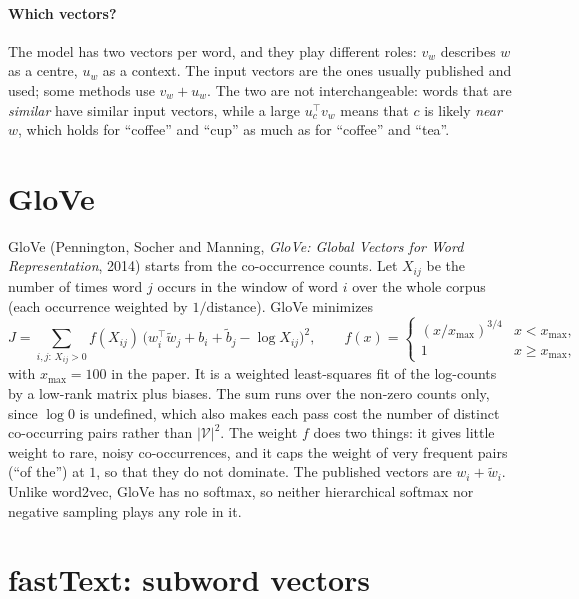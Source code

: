 \begin{notechapter}
\paragraph{Which vectors?} The model has two vectors per word, and they play different roles:
$v_w$ describes $w$ as a centre, $u_w$ as a context. The input vectors are the ones usually published and
used; some methods use $v_w + u_w$. The two are not interchangeable: words that are \emph{similar} have
similar input vectors, while a large $u_c^\top v_w$ means that $c$ is likely \emph{near} $w$, which holds for
``coffee'' and ``cup'' as much as for ``coffee'' and ``tea''.

\section{GloVe}\label{word-embeddings:sec:glove}

GloVe (Pennington, Socher and Manning, \emph{GloVe: Global Vectors for Word Representation},
2014) starts from the co-occurrence counts. Let $X_{ij}$ be the number of times word $j$ occurs in the
window of word $i$ over the whole corpus (each occurrence weighted by $1/\text{distance}$). GloVe
minimizes
\[
  J = \sum_{i,j:\,X_{ij}>0}f(X_{ij})\,\bigl(w_i^\top\tilde w_j + b_i + \tilde b_j - \log X_{ij}\bigr)^2,\qquad
  f(x) = \begin{cases}(x/x_{\max})^{3/4} & x < x_{\max},\\ 1 & x\geq x_{\max},\end{cases}
\]
with $x_{\max} = 100$ in the paper. It is a weighted least-squares fit of the log-counts by a
low-rank matrix plus biases. The sum runs over the non-zero counts only, since $\log0$ is undefined,
which also makes each pass cost the number of distinct co-occurring pairs rather than
$|\mathcal V|^2$. The weight $f$ does two things: it gives little weight to rare, noisy co-occurrences, and it
caps the weight of very frequent pairs (``of the'') at $1$, so that they do not dominate. The
published vectors are $w_i + \tilde w_i$. Unlike word2vec, GloVe has no softmax, so neither hierarchical
softmax nor negative sampling plays any role in it.

\section{fastText: subword vectors}\label{word-embeddings:sec:fasttext}


\end{notechapter}
